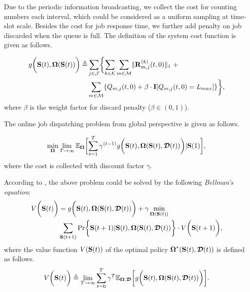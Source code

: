 Due to the periodic information broadcasting, we collect the cost for counting numbers each interval, which could be considered as a uniform sampling at time-slot scale.
Besides the cost for job response time, we further add penalty on job discarded when the queue is full.
The definition of the system cost function is given as follows.
\begin{definition}
    \begin{align}
        g\Paren{\Stat(t), \Policy(\Stat(t))} \define
            &\sum_{j\in\jSpace} \Brace{
                \sum_{k\in\apSet} \sum_{m\in\esSet} \Inorm{\vec{R}^{(k)}_{m,j}(t,0)}~+
                \nonumber\\
                &\sum_{m\in\esSet} \{ Q_{m,j}(t,0) + \beta \cdot \mat{I}[Q_{m,j}(t,0)=L_{max}] \}
            },
    \end{align}
    where $\beta$ is the weight factor for discard penalty ($\beta \in (0,1)$).
\end{definition}

The online job dispatching problem from global perspective is given as follows.
\begin{problem}
    \begin{align}
        \min_{\Policy} \lim_{T \to \infty}
            \mathbb{E}_{\Policy}
                \Bracket{ \sum_{t=1}^T \gamma^{(t-1)} g\Paren{\Stat(t), \Policy(\Stat(t), \Delay(t))} | \Stat(1) },
    \end{align}
    where the cost is collected with discount factor $\gamma$.
    \label{problem_1}
\end{problem}

According to \cite{sutton1998}, the above problem could be solved by the following \emph{Bellman's equation}:
\begin{align}
    V\Paren{\Stat(t)} &=g\Paren{\Stat(t), \Policy(\Stat(t), \Delay(t))}
        + \gamma \min_{\Policy(\Stat(t))}
        \nonumber\\
        &\sum_{\Stat(t+1)} \Pr\Brace{ \Stat(t+1)|\Stat(t), \Policy(\Stat(t), \Delay(t)) } \cdot V\Paren{\Stat(t+1)},
    \label{eqn:sp_0}
\end{align}
where the value function $V(\mathbf{S}(t))$ of the optimal policy $\boldsymbol{\Omega}^{*}(\mathbf{S}(t), \boldsymbol{\mathcal{D}}(t))$ is defined as follows.
\begin{align}
    V\bigg(\mathbf{S}(t)\bigg) \triangleq \lim_{T\to\infty} \sum_{t=0}^{T} \gamma^{T} \mathbb{E}_{\boldsymbol{\Omega}, \boldsymbol{\mathcal{D}}} \bigg[
        g\bigg( \mathbf{S}(t), \boldsymbol{\Omega}(\mathbf{S}(t), \boldsymbol{\mathcal{D}}(t)) \bigg)
    \bigg].
\end{align}

